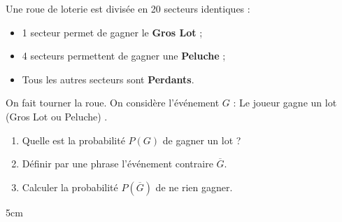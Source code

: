 \documentclass[a4paper]{book}
\begin{document}
    
    \begin{exercice}
        Une roue de loterie est divisée en 20 secteurs identiques :
        \begin{itemize}
            \item 1 secteur permet de gagner le \textbf{Gros Lot} ;
            \item 4 secteurs permettent de gagner une \textbf{Peluche} ;
            \item Tous les autres secteurs sont \textbf{Perdants}.
        \end{itemize}
        
        On fait tourner la roue. On considère l'événement $G$ : \og Le joueur gagne un lot (Gros Lot ou Peluche) \fg.
        
        \begin{enumerate}
            \item Quelle est la probabilité $P(G)$ de gagner un lot ? 
            \item Définir par une phrase l'événement contraire $\overline{G}$.
            \item Calculer la probabilité $P(\overline{G})$ de ne rien gagner.
        \end{enumerate}
    \end{exercice}
    
    \begin{ZoneReponse}{5cm}
    \end{ZoneReponse}
\end{document}
